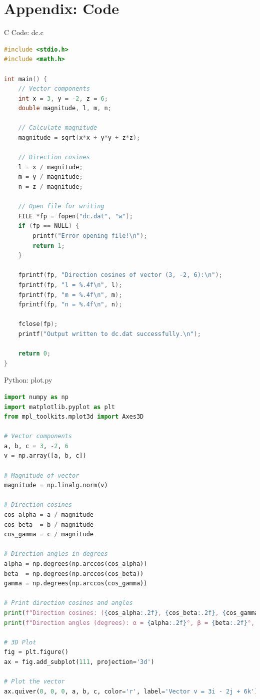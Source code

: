 \documentclass{beamer}
\numberwithin{equation}{section}
\theoremstyle{remark}
\begin{document}
\section*{Appendix: Code}

\begin{frame}[fragile]{C Code: dc.c}
\begin{lstlisting}[language=C]
#include <stdio.h>
#include <math.h>

int main() {
    // Vector components
    int x = 3, y = -2, z = 6;
    double magnitude, l, m, n;

    // Calculate magnitude
    magnitude = sqrt(x*x + y*y + z*z);

    // Direction cosines
    l = x / magnitude;
    m = y / magnitude;
    n = z / magnitude;

    // Open file for writing
    FILE *fp = fopen("dc.dat", "w");
    if (fp == NULL) {
        printf("Error opening file!\n");
        return 1;
    }

    fprintf(fp, "Direction cosines of vector (3, -2, 6):\n");
    fprintf(fp, "l = %.4f\n", l);
    fprintf(fp, "m = %.4f\n", m);
    fprintf(fp, "n = %.4f\n", n);

    fclose(fp);
    printf("Output written to dc.dat successfully.\n");

    return 0;
}
\end{lstlisting}
\end{frame}

\begin{frame}[fragile]{Python: plot.py}
\begin{lstlisting}[language=Python]
import numpy as np
import matplotlib.pyplot as plt
from mpl_toolkits.mplot3d import Axes3D

# Vector components
a, b, c = 3, -2, 6
v = np.array([a, b, c])

# Magnitude of vector
magnitude = np.linalg.norm(v)

# Direction cosines
cos_alpha = a / magnitude
cos_beta  = b / magnitude
cos_gamma = c / magnitude

# Direction angles in degrees
alpha = np.degrees(np.arccos(cos_alpha))
beta  = np.degrees(np.arccos(cos_beta))
gamma = np.degrees(np.arccos(cos_gamma))

# Print direction cosines and angles
print(f"Direction cosines: ({cos_alpha:.2f}, {cos_beta:.2f}, {cos_gamma:.2f})")
print(f"Direction angles (degrees): α = {alpha:.2f}°, β = {beta:.2f}°, γ = {gamma:.2f}°")

# 3D Plot
fig = plt.figure()
ax = fig.add_subplot(111, projection='3d')

# Plot the vector
ax.quiver(0, 0, 0, a, b, c, color='r', label='Vector v = 3i - 2j + 6k')
  \end{lstlisting}
\end{frame}
\end{document}
